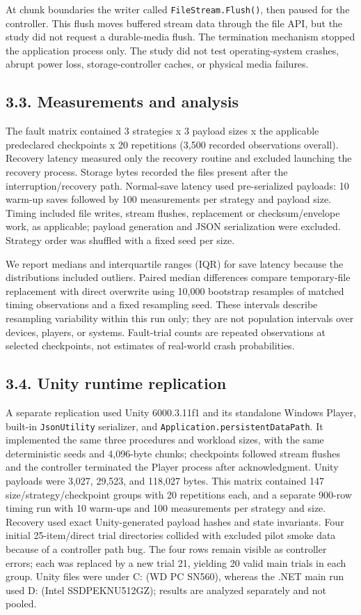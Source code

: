 \documentclass{jepcs}
\begin{document}
At chunk boundaries the writer called \texttt{FileStream.Flush()}, then paused for the controller. This flush moves buffered stream data through the file API, but the study did not request a durable-media flush. The termination mechanism stopped the application process only. The study did not test operating-system crashes, abrupt power loss, storage-controller caches, or physical media failures.

\subsection{3.3. Measurements and analysis}
The fault matrix contained 3 strategies x 3 payload sizes x the applicable predeclared checkpoints x 20 repetitions (3,500 recorded observations overall). Recovery latency measured only the recovery routine and excluded launching the recovery process. Storage bytes recorded the files present after the interruption/recovery path. Normal-save latency used pre-serialized payloads: 10 warm-up saves followed by 100 measurements per strategy and payload size. Timing included file writes, stream flushes, replacement or checksum/envelope work, as applicable; payload generation and JSON serialization were excluded. Strategy order was shuffled with a fixed seed per size.

We report medians and interquartile ranges (IQR) for save latency because the distributions included outliers. Paired median differences compare temporary-file replacement with direct overwrite using 10,000 bootstrap resamples of matched timing observations and a fixed resampling seed. These intervals describe resampling variability within this run only; they are not population intervals over devices, players, or systems. Fault-trial counts are repeated observations at selected checkpoints, not estimates of real-world crash probabilities.

\subsection{3.4. Unity runtime replication}
A separate replication used Unity 6000.3.11f1 and its standalone Windows Player, built-in \texttt{JsonUtility} serializer, and \texttt{Application.persistentDataPath}. It implemented the same three procedures and workload sizes, with the same deterministic seeds and 4,096-byte chunks; checkpoints followed stream flushes and the controller terminated the Player process after acknowledgment. Unity payloads were 3,027, 29,523, and 118,027 bytes. This matrix contained 147 size/strategy/checkpoint groups with 20 repetitions each, and a separate 900-row timing run with 10 warm-ups and 100 measurements per strategy and size. Recovery used exact Unity-generated payload hashes and state invariants. Four initial 25-item/direct trial directories collided with excluded pilot smoke data because of a controller path bug. The four rows remain visible as controller errors; each was replaced by a new trial 21, yielding 20 valid main trials in each group. Unity files were under C: (WD PC SN560), whereas the .NET main run used D: (Intel SSDPEKNU512GZ); results are analyzed separately and not pooled.
\end{document}
